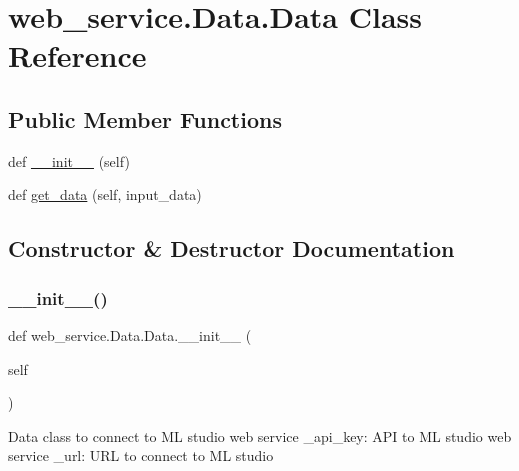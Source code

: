 \hypertarget{classweb__service_1_1_data_1_1_data}{}\section{web\+\_\+service.\+Data.\+Data Class Reference}
\label{classweb__service_1_1_data_1_1_data}
\subsection*{Public Member Functions}
\begin{DoxyCompactItemize}
\item 
def \mbox{\hyperlink{classweb__service_1_1_data_1_1_data_a8f843b77e0a7cf2d263a2f28696c4f58}{\+\_\+\+\_\+init\+\_\+\+\_\+}} (self)
\item 
def \mbox{\hyperlink{classweb__service_1_1_data_1_1_data_ae5f263f0a89d3a6b2bbbcac8d590f4cc}{get\+\_\+data}} (self, input\+\_\+data)
\end{DoxyCompactItemize}


\subsection{Constructor \& Destructor Documentation}
\mbox{\label{classweb__service_1_1_data_1_1_data_a8f843b77e0a7cf2d263a2f28696c4f58}} 
\subsubsection{\texorpdfstring{\+\_\+\+\_\+init\+\_\+\+\_\+()}{\_\_init\_\_()}}
{\footnotesize\ttfamily def web\+\_\+service.\+Data.\+Data.\+\_\+\+\_\+init\+\_\+\+\_\+ (\begin{DoxyParamCaption}\item[{}]{self }\end{DoxyParamCaption})}

\begin{DoxyVerb}    Data class to connect to ML studio web service
    _api_key: API to ML studio web service
    _url: URL to connect to ML studio
\end{DoxyVerb}
 


